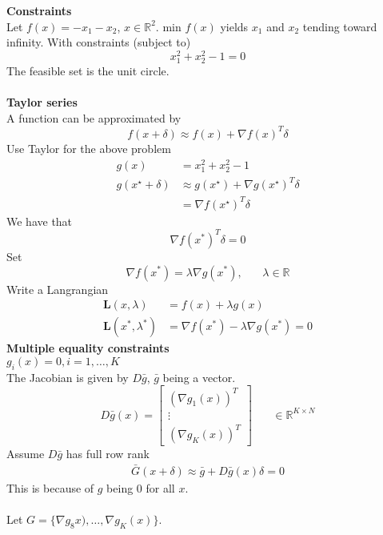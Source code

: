 \documentclass[12pt,a4paper]{report}
\author{Frederik Appel Vardinghus-Nielsen}
\begin{document}
\noindent\textbf{Constraints}\\
Let $f(x)=-x_1-x_2$, $x\in\mathbb{R}^2$. min $f(x)$ yields $x_1$ and $x_2$ tending toward infinity. With constraints (subject to)
\begin{equation}
x_1^2+x_2^2-1=0
\end{equation}
The feasible set is the unit circle.\\\\
\textbf{Taylor series}\\
A function can be approximated by
\begin{equation}
f(x+\delta)\approx f(x)+\nabla f(x)^T\delta
\end{equation}
Use Taylor for the above problem
\begin{align*}
g(x)&=x_1^2+x_2^2-1 \\
g(x^{\star}+\delta)& \approx g(x^{\star})+\nabla g(x^{\star})^T\delta\\
&=\nabla f(x^{\star})^T\delta
\end{align*}
We have that
\begin{equation}
\nabla f(x^*)^T\delta=0
\end{equation}
Set
\begin{equation}
\nabla f(x^*)=\lambda\nabla g(x^*),\phantom{mm}\lambda\in\mathbb{R}
\end{equation}
Write a Langrangian
\begin{align*}
\mathbf{L}(x,\lambda)&=f(x)+\lambda g(x)\\
\mathbf{L}(x^*,\lambda^*)&=\nabla f(x^*)-\lambda\nabla g(x^*)=0
\end{align*}
\textbf{Multiple equality constraints}\\
$g_i(x)=0, i=1,\ldots,K$\\
The Jacobian is given by $D\bar{g}$, $\bar{g}$ being a vector.
\begin{equation}
D\bar{g}(x)=\begin{bmatrix}(\nabla g_1(x))^T\\
\vdots\\
(\nabla g_K(x))^T\end{bmatrix} \phantom{mm} \in\mathbb{R}^{K\times N}
\end{equation}
Assume $D\bar{g}$ has full row rank
\begin{align*}
\bar{G}(x+\delta)\approx \bar{g}+D\bar{g}(x)\delta=0
\end{align*}
This is because of $g$ being 0 for all $x$.\\\\
Let $G=\{\nabla g_8x),\ldots,\nabla g_K(x)\}$.\\
\end{document}
